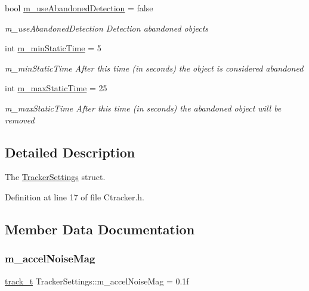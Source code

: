 \begin{DoxyCompactItemize}
bool \mbox{\hyperlink{struct_tracker_settings_ad38082863e30ac990ff8d5b49a02ee70}{m\+\_\+use\+Abandoned\+Detection}} = false
\begin{DoxyCompactList}\small\item\em m\+\_\+use\+Abandoned\+Detection Detection abandoned objects \end{DoxyCompactList}\item 
int \mbox{\hyperlink{struct_tracker_settings_aee7628ff95fa54ad4422e01d45690a6d}{m\+\_\+min\+Static\+Time}} = 5
\begin{DoxyCompactList}\small\item\em m\+\_\+min\+Static\+Time After this time (in seconds) the object is considered abandoned \end{DoxyCompactList}\item 
int \mbox{\hyperlink{struct_tracker_settings_a810f1687289a964756cd700a22d219d2}{m\+\_\+max\+Static\+Time}} = 25
\begin{DoxyCompactList}\small\item\em m\+\_\+max\+Static\+Time After this time (in seconds) the abandoned object will be removed \end{DoxyCompactList}\end{DoxyCompactItemize}


\subsection{Detailed Description}
The \mbox{\hyperlink{struct_tracker_settings}{Tracker\+Settings}} struct. 

Definition at line 17 of file Ctracker.\+h.



\subsection{Member Data Documentation}
\mbox{\label{struct_tracker_settings_a9d4bcf1b68d5a13de8f9fea89f3b694f}} 
\subsubsection{\texorpdfstring{m\+\_\+accel\+Noise\+Mag}{m\_accelNoiseMag}}
{\footnotesize\ttfamily \mbox{\hyperlink{defines_8h_a7ce9c8817b42ab418e61756f579549ab}{track\+\_\+t}} Tracker\+Settings\+::m\+\_\+accel\+Noise\+Mag = 0.\+1f}



